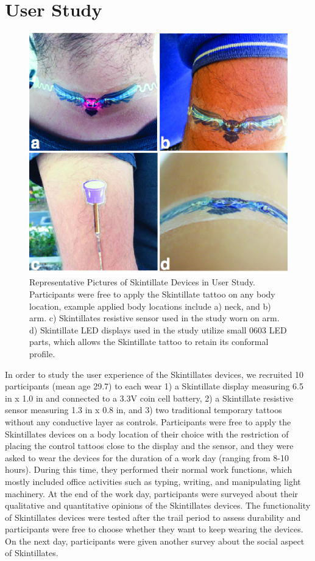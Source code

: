 \documentclass{sigchi}
\begin{document}
\section {User Study}
\begin{figure} [b!]
\centering
\includegraphics[width=1\columnwidth]{figures/Figure11}
\caption{Representative Pictures of Skintillate Devices in User Study. Participants were free to apply the Skintillate tattoo on any body location, example applied body locations include a) neck, and b) arm. c) Skintillates resistive sensor used in the study worn on arm. d) Skintillate LED displays used in the study utilize small 0603 LED parts, which allows the Skintillate tattoo to retain its conformal profile. }
\vspace{-8pt}
\label{fig:userstudy}
\end{figure}
In order to study the user experience of the Skintillates devices, we recruited 10 participants (mean age 29.7) to each wear 1) a Skintillate display measuring 6.5 in x 1.0 in and connected to a 3.3V coin cell battery, 2) a Skintillate resistive sensor measuring 1.3 in x 0.8 in, and 3) two traditional temporary tattoos without any conductive layer as controls. Participants were free to apply the Skintillates devices on a body location of their choice with the restriction of placing the control tattoos close to the display and the sensor,  and they were asked to wear the devices for the duration of a work day (ranging from 8-10 hours). During this time, they performed their normal work functions, which mostly included office activities such as typing, writing, and manipulating light machinery. At the end of the work day, participants were surveyed about their qualitative and quantitative opinions of the Skintillates devices. The functionality of Skintillates devices were tested after the trail period to assess durability and participants were free to choose whether they want to keep wearing the devices. On the next day, participants were given another survey about the social aspect of Skintillates.
\end{document}

